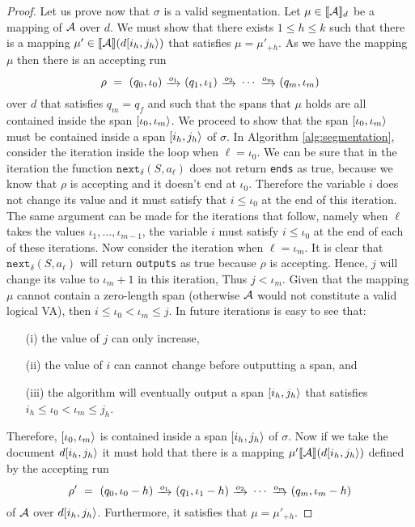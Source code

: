 \begin{proof}
    Let us prove now that $\sigma$ is a valid segmentation. Let $\mu \in \llbracket\mathcal{A}\rrbracket_d$ be a mapping of $\mathcal{A}$ over $d$. We must show that there exists $1 \leq h \leq k$ such that there is a mapping $\mu' \in \llbracket\mathcal{A}\rrbracket(d[i_h, j_h\rangle)$ that satisfies $\mu = \mu'_{+h}$. As we have the mapping $\mu$ then there is an accepting run 
    $$
    \rho \ = \ (q_0, \iota_0) \ \trans{o_1} \ (q_1, \iota_1) \ \trans{o_2} \ \cdots \ \trans{o_m} \ (q_m, \iota_m)
    $$ 
    over $d$ that satisfies $q_m = q_f$ and such that the spans that $\mu$ holds are all contained inside the span $[\iota_0, \iota_m\rangle$. We proceed to show that the span $[\iota_0, \iota_m\rangle$ must be contained inside a span $[i_h, j_h\rangle$ of $\sigma$. In Algorithm \ref{alg:segmentation}, consider the iteration inside the loop when $\ell = \iota_0$. We can be sure that in the iteration the function $\texttt{next}_\delta(S, a_\ell)$ does not return \texttt{ends} as true, because we know that $\rho$ is accepting and it doesn't end at $\iota_0$. Therefore the variable $i$ does not change its value and it must satisfy that $i \leq \iota_0$ at the end of this iteration. The same argument can be made for the iterations that follow, namely when $\ell$ takes the values $\iota_1, \ldots, \iota_{m-1}$, the variable $i$ must satisfy $i \leq \iota_0$ at the end of each of these iterations. Now consider the iteration when $\ell = \iota_m$. It is clear that $\texttt{next}_\delta(S, a_\ell)$ will return \texttt{outputs} as true because $\rho$ is accepting. Hence, $j$ will change its value to $\iota_m + 1$ in this iteration, Thus $j < \iota_m$. Given that the mapping $\mu$ cannot contain a zero-length span (otherwise $\mathcal{A}$ would not constitute a valid logical VA), then $i \leq \iota_0 < \iota_m \leq j$. In future iterations is easy to see that:
    \begin{enumerate}
        \item[(i)] the value of $j$ can only increase,
        \item[(ii)] the value of $i$ can cannot change before outputting a span, and
        \item[(iii)] the algorithm will eventually output a span $[i_h, j_h\rangle$ that satisfies $i_h \leq \iota_0 < \iota_m \leq j_h$. 
    \end{enumerate}
    Therefore, $[\iota_0, \iota_m\rangle$ is contained inside a span $[i_h, j_h\rangle$ of $\sigma$. Now if we take the document $d[i_h, j_h\rangle$ it must hold that there is a mapping $\mu' \llbracket\mathcal{A}\rrbracket(d[i_h, j_h\rangle)$ defined by the accepting run 
    $$
    \rho' \ = \ (q_0, \iota_0-h) \ \trans{o_1} \ (q_1, \iota_1-h) \ \trans{o_2} \ \cdots \ \trans{o_m} \ (q_m, \iota_m-h)
    $$ 
    of $\mathcal{A}$ over $d[i_h, j_h\rangle$. Furthermore, it satisfies that $\mu = \mu'_{+h}$.


\end{proof}
